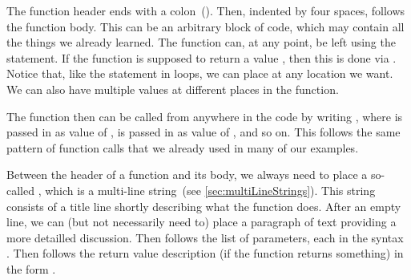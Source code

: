 The function header ends with a colon~(\pythonilIdx{:}).%
%
%
%
Then, indented by four spaces, follows the function body.%
%
%
%
This can be an arbitrary block of code, which may contain all the things we already learned.
The function can, at any point, be left using the  statement.
If the function is supposed to return a value , then this is done via .
Notice that, like the  statement in loops, we can place  at any location we want.
We can also have multiple  values at different places in the function.%
%
\begin{sloppypar}%
The function  then can be called from anywhere in the code by writing , where  is passed in as value of ,  is passed in as value of , and so on.
This follows the same pattern of function calls that we already used in many of our examples.%
\end{sloppypar}%
%
%
Between the header of a function and its body, we always need to place a so-called , which is a multi-line string~(see \cref{sec:multiLineStrings}).
This string consists of a title line shortly describing what the function does.
After an empty line, we can (but not necessarily need to) place a paragraph of text providing a more detailled discussion.
Then follows the list of parameters, each in the syntax .
Then follows the return value description (if the function returns something) in the form .%
%
%
%
%
